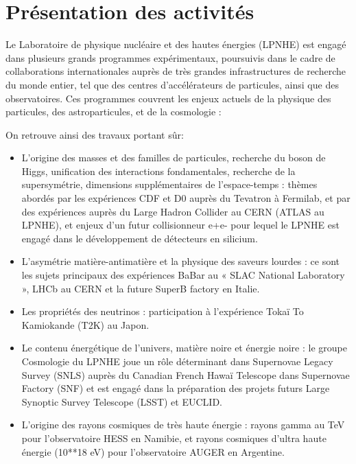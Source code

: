\documentclass[french,a4paper,12pt]{report}
\begin{document}
  \section{Présentation des activités}
  Le Laboratoire de physique nucléaire et des hautes énergies (LPNHE) est engagé dans plusieurs grands programmes expérimentaux, poursuivis dans le cadre de collaborations internationales auprès de très grandes infrastructures de recherche du monde entier, tel que des centres d’accélérateurs de particules, ainsi que des observatoires. Ces programmes couvrent les enjeux actuels de la physique des particules, des astroparticules, et de la cosmologie :
  
  On retrouve ainsi des travaux portant sûr:  
  \begin{itemize}
  \item L'origine des masses et des familles de particules, recherche du boson de Higgs, unification des interactions fondamentales, recherche de la supersymétrie, dimensions supplémentaires de l’espace-temps : thèmes abordés par les expériences CDF et D0 auprès du Tevatron à Fermilab, et par des expériences auprès du Large Hadron Collider au CERN (ATLAS au LPNHE), et enjeux d’un futur collisionneur e+e- pour lequel le LPNHE est engagé dans le développement de détecteurs en silicium.
  
  \item L’asymétrie matière-antimatière et la physique des saveurs lourdes : ce sont les sujets principaux des expériences BaBar au « SLAC National Laboratory », LHCb au CERN et la future SuperB factory en Italie.
  
  \item Les propriétés des neutrinos : participation à l’expérience Tokaï To Kamiokande (T2K) au Japon.
  
  \item Le contenu énergétique de l’univers, matière noire et énergie noire : le groupe Cosmologie du LPNHE joue un rôle déterminant dans Supernovae Legacy Survey (SNLS) auprès du Canadian French Hawaï Telescope dans Supernovae Factory (SNF) et est engagé dans la préparation des projets futurs Large Synoptic Survey Telescope (LSST) et EUCLID.
  
  \item L'origine des rayons cosmiques de très haute énergie : rayons gamma au TeV pour l’observatoire HESS en Namibie, et rayons cosmiques d’ultra haute énergie (10**18 eV) pour l’observatoire AUGER en Argentine.
  \end{itemize}
  
\end{document}
